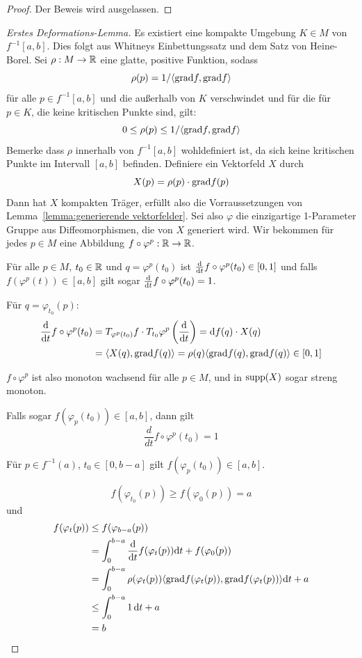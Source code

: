 \begin{proof} Der Beweis wird ausgelassen. \end{proof}

\begin{proof}[Erstes Deformations-Lemma]
    Es existiert eine kompakte Umgebung $K \in M$ von $f^{-1}[a, b]$. Dies folgt
    aus Whitneys Einbettungssatz und dem Satz von Heine-Borel.
    Sei $\rho: M \to { \mathbb R }$ eine glatte, positive Funktion, sodass
    \[ \rho(p) = 1 / \langle { \operatorname{grad} } f, { \operatorname{grad} } f \rangle \]
    für alle $p \in f^{-1}[a, b]$ und die außerhalb von $K$ verschwindet und für
    die für $p \in K$, die keine kritischen Punkte sind, gilt: 
    \[ 0 \leq \rho(p) \leq 1 / \langle { \operatorname{grad} } f, { \operatorname{grad} } f \rangle \]
    Bemerke dass $\rho$ innerhalb von $f^{-1}[a, b]$ wohldefiniert 
    ist, da sich keine kritischen Punkte im Intervall $[a, b]$ befinden. 
    Definiere ein Vektorfeld $X$ durch
    \[ X(p) = \rho(p) \cdot { \operatorname{grad} } f (p) \]
    Dann hat $X$ kompakten Träger, erfüllt also die Vorraussetzungen von 
    Lemma~\ref{lemma:generierende vektorfelder}. Sei also $\varphi$ die
    einzigartige 1-Parameter Gruppe aus Diffeomorphismen, die von $X$ generiert
    wird. 
    Wir bekommen für jedes $p \in M$ eine Abbildung $f \circ \varphi^p: { \mathbb R } \to { \mathbb R }$.
    
     Für alle $p \in M$, $t_0 \in { \mathbb R }$ und $q = \varphi^p(t_0)$
    ist ${ \frac{{ \operatorname{d} } }{{ \operatorname{d} } t} } f \circ \varphi^p (t_0) \in [0, 1]$ und falls $f(\varphi^p(t)) \in [a, b]$
    gilt sogar ${ \frac{{ \operatorname{d} } }{{ \operatorname{d} } t} } f \circ \varphi^p (t_0) = 1$.

    Für $q = \varphi_{t_0}(p)$:
    \begin{align*}
        { \frac{{ \operatorname{d} }}{{ \operatorname{d} }t} } f \circ \varphi^p (t_0)
        & = T_{\varphi^p(t_0)} f \cdot T_{t_0}\varphi^p \left( { \frac{{ \operatorname{d} } }{{ \operatorname{d} } t} } \right)
        = { \operatorname{d} } f (q) \cdot X(q) \\
        & = \langle X(q), { \operatorname{grad} } f (q) \rangle 
        = \rho(q) \langle { \operatorname{grad} } f (q), { \operatorname{grad} } f (q) \rangle \in [0, 1]
    \end{align*}
    
    $f \circ \varphi^p$ ist also monoton wachsend für alle $p \in M$, und in 
    ${ \operatorname{supp} } (X)$ sogar streng monoton.

    Falls sogar $f(\varphi_p(t_0)) \in [a, b]$, dann gilt
    \[ \frac{d}{dt} f \circ \varphi^p (t_0) = 1 \]
    \sectiondone

     Für $p \in f^{-1}(a)$, $t_0 \in [0, b-a]$ gilt $f(\varphi_p(t_0)) \in [a, b]$.
    
    \[ f(\varphi_{t_0}(p)) \geq f(\varphi_0(p)) = a \]
    und
    \begin{align*}
        f(\varphi_t(p)) 
        & \leq f(\varphi_{b-a}(p)) \\
        & = \int_0^{b-a}{ \frac{{ \operatorname{d} } }{{ \operatorname{d} } t} } f(\varphi_t(p)) { \operatorname{d} } t + f(\varphi_0(p)) \\
        & = \int_0^{b-a}\rho(\varphi_t(p)) \langle { \operatorname{grad} } f (\varphi_t(p)), { \operatorname{grad} } f (\varphi_t(p)) \rangle { \operatorname{d} } t + a \\
        & \leq \int_0^{b-a} 1 \, { \operatorname{d} } t + a \\
        & = b
    \end{align*}
    \sectiondone


\end{proof}
